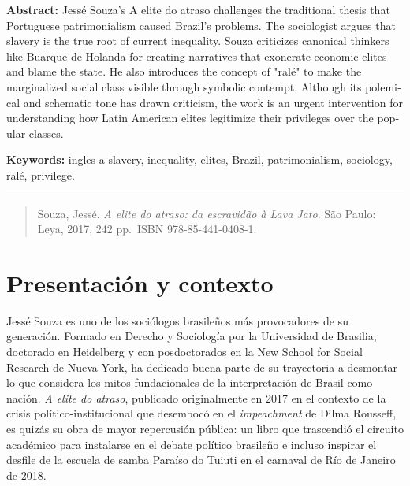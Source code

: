 \begin{tcolorbox}[colback=brown!8!white,colframe=brown!8!white,boxrule=0pt,arc=2pt,left=4pt,right=4pt,top=3pt,bottom=3pt,before skip=4pt,after skip=4pt]
\begin{otherlanguage}{english}
\sffamily\small \textbf{Abstract:} Jessé Souza's A elite do atraso challenges the traditional thesis that Portuguese patrimonialism caused Brazil's problems. The sociologist argues that slavery is the true root of current inequality. Souza criticizes canonical thinkers like Buarque de Holanda for creating narratives that exonerate economic elites and blame the state. He also introduces the concept of "ralé" to make the marginalized social class visible through symbolic contempt. Although its polemical and schematic tone has drawn criticism, the work is an urgent intervention for understanding how Latin American elites legitimize their privileges over the popular classes.
\par\smallskip\noindent\textbf{Keywords:} ingles a slavery, inequality, elites, Brazil, patrimonialism, sociology, ralé, privilege.
\end{otherlanguage}
\end{tcolorbox}

\bigskip
\noindent\rule{\linewidth}{0.4pt}
\bigskip


\begin{quote}
Souza, Jessé. \textit{A elite do atraso: da escravidão à Lava Jato}. São Paulo: Leya, 2017, 242 pp. ISBN 978-85-441-0408-1.

\end{quote}

\section{Presentación y contexto}
Jessé Souza es uno de los sociólogos brasileños más provocadores de su generación. Formado en Derecho y Sociología por la Universidad de Brasilia, doctorado en Heidelberg y con posdoctorados en la New School for Social Research de Nueva York, ha dedicado buena parte de su trayectoria a desmontar lo que considera los mitos fundacionales de la interpretación de Brasil como nación. \textit{A elite do atraso}, publicado originalmente en 2017 en el contexto de la crisis político-institucional que desembocó en el \textit{impeachment} de Dilma Rousseff, es quizás su obra de mayor repercusión pública: un libro que trascendió el circuito académico para instalarse en el debate político brasileño e incluso inspirar el desfile de la escuela de samba Paraíso do Tuiuti en el carnaval de Río de Janeiro de 2018.

